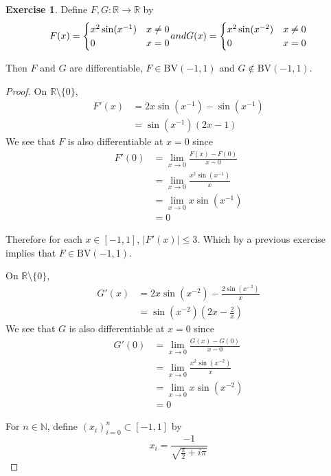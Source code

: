 \documentclass[12pt]{amsart}
\theoremstyle{definition}
\newtheorem{ex}[definition]{Exercise}
\newcommand{\N}{\mathbb{N}}
\newcommand{\R}{\mathbb{R}}
\newcommand{\BV}{\text{BV}}
\newcommand{\lex}[1]{\label{ex:#1}}
\begin{document}
	\begin{ex} \lex{00000} 
		Define $F,G:\R \rightarrow \R$ by 
		\[ F(x) = \begin{cases}
			x^2 \sin(x^{-1}) & x \neq 0\\
			0 & x=0\\
		\end{cases}$$ and $$G(x)=
		\begin{cases}
			x^2 \sin(x^{-2}) & x \neq 0\\
			0 & x=0
		\end{cases}
		\]
		
		Then $F$ and $G$ are differentiable, $F \in \BV(-1,1)$ and $G \not \in \BV(-1,1)$.
	\end{ex}
	
	\begin{proof}
		On $\R \setminus \{0\}$, 
		\begin{align*}
			F'(x) 
			&= 2x \sin(x^{-1})- \sin(x^{-1})\\
			&= \sin(x^{-1})(2x-1)
		\end{align*} We see that $F$ is also differentiable at $x=0$ since 
		\begin{align*}
			F'(0) 
			&= \lim_{x \rightarrow 0} \frac{F(x)-F(0)}{x-0}\\
			&= \lim_{x \rightarrow 0} \frac{x^2 \sin(x^{-1})}{x}\\
			&= \lim_{x \rightarrow 0} x \sin(x^{-1})\\
			&=0
		\end{align*}
		
		Therefore for each $x \in [-1,1]$, $|F'(x)| \leq 3$. Which by a previous exercise implies that $F \in \BV(-1,1)$.
		
		On $\R \setminus \{0\}$, 
		\begin{align*}
			G'(x)
			&= 2x \sin(x^{-2})-\frac{2 \sin(x^{-2})}{x}\\
			&= \sin(x^{-2})(2x-\frac{2}{x})
		\end{align*}
		We see that $G$ is also differentiable at $x=0$ since 
		\begin{align*}
			G'(0) 
			&= \lim_{x \rightarrow 0} \frac{G(x)-G(0)}{x-0}\\
			&= \lim_{x \rightarrow 0} \frac{x^2 \sin(x^{-2})}{x}\\
			&= \lim_{x \rightarrow 0} x \sin(x^{-2})\\
			&=0
		\end{align*}
		
		For $n \in \N$, define $(x_i)_{i=0}^n \subset [-1,1]$ by $$x_i= \frac{-1}{\sqrt{\frac{\pi}{2}+i\pi}}$$
		

\end{proof}
\end{document}
